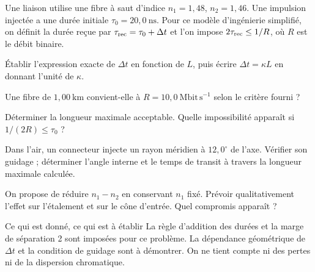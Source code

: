 \label{ex-D2}
Une liaison utilise une fibre à saut d'indice $n_1=1{,}48$, $n_2=1{,}46$. Une impulsion injectée a une durée initiale $\tau_0=20{,}0\ \mathrm{ns}$. Pour ce modèle d'ingénierie simplifié, on définit la durée reçue par $\tau_{\rm rec}=\tau_0+\Delta t$ et l'on impose $2\tau_{\rm rec}\leq1/R$, où $R$ est le débit binaire.
\begin{questions}
\item Établir l'expression exacte de $\Delta t$ en fonction de $L$, puis écrire $\Delta t=\kappa L$ en donnant l'unité de $\kappa$.
\item Une fibre de $1{,}00\ \mathrm{km}$ convient-elle à $R=10{,}0\ \mathrm{Mbit\,s^{-1}}$ selon le critère fourni ?
\item Déterminer la longueur maximale acceptable. Quelle impossibilité apparaît si $1/(2R)\leq\tau_0$ ?
\item Dans l'air, un connecteur injecte un rayon méridien à $12{,}0^\circ$ de l'axe. Vérifier son guidage ; déterminer l'angle interne et le temps de transit à travers la longueur maximale calculée.
\item On propose de réduire $n_1-n_2$ en conservant $n_1$ fixé. Prévoir qualitativement l'effet sur l'étalement et sur le cône d'entrée. Quel compromis apparaît ?
\end{questions}
\begin{docu}{Ce qui est donné, ce qui est à établir}
La règle d'addition des durées et la marge de séparation 2 sont imposées pour ce problème. La dépendance géométrique de $\Delta t$ et la condition de guidage sont à démontrer. On ne tient compte ni des pertes ni de la dispersion chromatique.
\end{docu}


